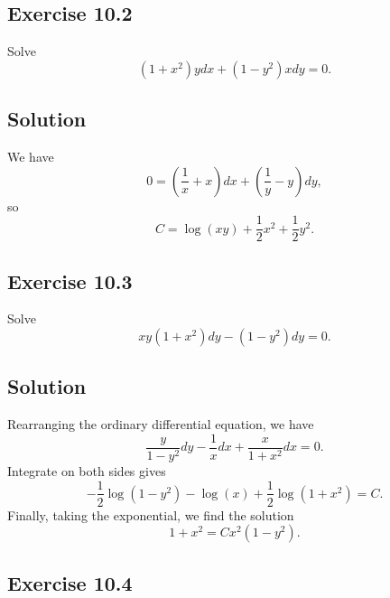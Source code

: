 \subsection*{Exercise 10.2}

Solve
\begin{equation*}
    (1 + x^2) y dx + (1 - y^2) x dy = 0.
\end{equation*}

\subsection*{Solution}

We have
\begin{equation*}
    0 = \left(\frac{1}{x} + x\right)dx + \left(\frac{1}{y} - y\right)dy,
\end{equation*}
so
\begin{equation*}
    C = \log(xy) + \frac{1}{2}x^2 + \frac{1}{2}y^2.
\end{equation*}


\subsection*{Exercise 10.3}

Solve
\begin{equation*}
    xy(1 + x^2) dy - (1 - y^2) dy = 0.
\end{equation*}

\subsection*{Solution}

Rearranging the ordinary differential equation, we have
\begin{equation*}
    \frac{y}{1 - y^2}dy - \frac{1}{x} dx + \frac{x}{1 + x^2} dx = 0.
\end{equation*}
Integrate on both sides gives
\begin{equation*}
    -\frac{1}{2} \log(1 - y^2) - \log(x) + \frac{1}{2} \log(1 + x^2) = C.
\end{equation*}
Finally, taking the exponential, we find the solution
\begin{equation*}
    1 + x^2 = C x^2 (1 - y^2).
\end{equation*}


\subsection*{Exercise 10.4}

